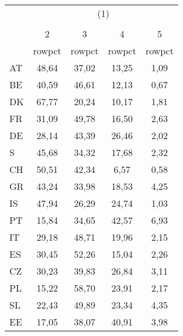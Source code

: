 {
\def\sym#1{\ifmmode^{#1}\else\(^{#1}\)\fi}
\begin{tabular}{l*{4}{c}}
\hline\hline
            &\multicolumn{4}{c}{(1)}                            \\
            &\multicolumn{4}{c}{}                               \\
            &           2&           3&           4&           5\\
            &      rowpct&      rowpct&      rowpct&      rowpct\\
\hline
AT          &       48,64&       37,02&       13,25&        1,09\\
BE          &       40,59&       46,61&       12,13&        0,67\\
DK          &       67,77&       20,24&       10,17&        1,81\\
FR          &       31,09&       49,78&       16,50&        2,63\\
DE          &       28,14&       43,39&       26,46&        2,02\\
S           &       45,68&       34,32&       17,68&        2,32\\
CH          &       50,51&       42,34&        6,57&        0,58\\
GR          &       43,24&       33,98&       18,53&        4,25\\
IS          &       47,94&       26,29&       24,74&        1,03\\
PT          &       15,84&       34,65&       42,57&        6,93\\
IT          &       29,18&       48,71&       19,96&        2,15\\
ES          &       30,45&       52,26&       15,04&        2,26\\
CZ          &       30,23&       39,83&       26,84&        3,11\\
PL          &       15,22&       58,70&       23,91&        2,17\\
SL          &       22,43&       49,89&       23,34&        4,35\\
EE          &       17,05&       38,07&       40,91&        3,98\\
\hline\hline
\end{tabular}
}
